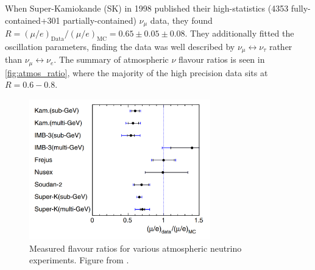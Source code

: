 When Super-Kamiokande (SK) in 1998 published\cite{sk_disc} their high-statistics (4353 fully-contained+301 partially-contained) $\nu_\mu$ data, they found $R=\left( \mu/e \right)_\text{Data}/\left( \mu/e \right)_\text{MC} =0.65\pm0.05\pm0.08$. They additionally fitted the oscillation parameters, finding the data was well described by $\nu_\mu \leftrightarrow \nu_\tau$ rather than $\nu_\mu \leftrightarrow \nu_e$. The summary of atmospheric $\nu$ flavour ratios is seen in \autoref{fig:atmos_ratio}, where the majority of the high precision data sits at $R=0.6-0.8$.
\begin{figure}[h]
	\includegraphics[width=0.7\textwidth, trim={0mm 0mm 0mm 0mm}, clip,page=1]{figures/theory/flavour_ratio}
	\caption{Measured flavour ratios for various atmospheric neutrino experiments. Figure from \cite{kajita_summary}.}
	\label{fig:atmos_ratio}
\end{figure}

